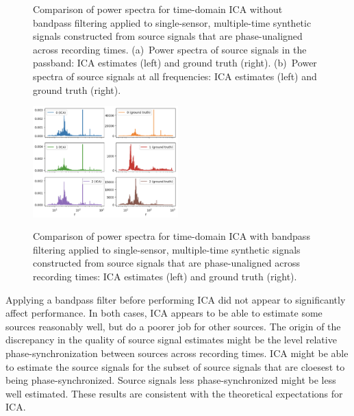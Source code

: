 \documentclass[10pt]{article}
\begin{document}
\begin{figure}[ht]
    \vspace{0.1in}
    \begin{minipage}{0.85\linewidth}
    \caption{\label{fig:single-sensor-ica-time-domain-phase-unaligned-without-filter-source-power-spectra}
        Comparison of power spectra for time-domain ICA without bandpass filtering applied
        to single-sensor, multiple-time synthetic signals constructed from source signals
        that are phase-unaligned across recording times.
        (a)~Power spectra of source signals in the passband: ICA estimates (left) and
        ground truth (right).
        (b)~Power spectra of source signals at all frequencies: ICA estimates (left)
        and ground truth (right).
    }
    \end{minipage}
\end{figure}

\begin{figure}[ht]
    \centering
    \includegraphics[width=0.5\textwidth]{single-sensor-ica-time-domain-phase-unaligned-with-filter-source-power-spectra}
    \begin{minipage}{0.85\linewidth}
    \caption{\label{fig:single-sensor-ica-time-domain-phase-unaligned-with-filter-source-power-spectra}}
        Comparison of power spectra for time-domain ICA with bandpass filtering applied to
        single-sensor, multiple-time synthetic signals constructed from source signals that
        are phase-unaligned across recording times: ICA estimates (left) and ground truth
        (right).
    \end{minipage}
\end{figure}

Applying a bandpass filter before performing ICA did not appear to significantly affect
performance. In both cases, ICA appears to be able to estimate some sources reasonably
well, but do a poorer job for other sources. The origin of the discrepancy in the quality
of source signal estimates might be the level relative phase-synchronization between
sources across recording times. ICA might be able to estimate the source signals for the
subset of source signals that are cloesest to being phase-synchronized. Source signals
less phase-synchronized might be less well estimated. These results are consistent with
the theoretical expectations for ICA.
\end{document}
